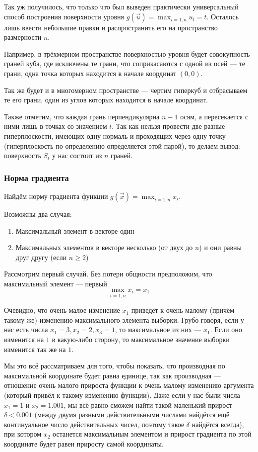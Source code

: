 Так уж получилось, что только что был выведен
практически универсальный способ построения поверхности уровня
$g\left( \vec{u} \right) = \max_{i= \overline{1,n}} u_i = t$.
Осталось лишь ввести небольшие правки и распространить его на
пространство размерности $n$.

Например, в трёхмерном пространстве поверхностью уровня будет
совокупность граней куба, где исключены те грани,
что соприкасаются с одной из осей --- те грани, одна точка которых
находится в начале координат $\left( 0, 0 \right)$.

Так же будет и в многомерном пространстве --- чертим гиперкуб
и отбрасываем те его грани, один из углов которых находится в начале координат.

Также отметим, что каждая грань перпендикулярна $n-1$ осям,
а пересекается с ними лишь в точках со значением $t$.
Так как нельзя провести две разные гиперплоскости, имеющих одну нормаль
и проходящих через одну точку (гиперплоскость по определению
определяется этой парой), то делаем вывод:
поверхность $S_t$ у нас состоит из $n$ граней.

\subsubsection{Норма градиента}
Найдём норму градиента функции
$g\left( \vec{x} \right) = \max_{i= \overline{1,n}} x_i$.

Возможны два случая:
\begin{enumerate}
  \item Максимальный элемент в векторе один
  \item Максимальных элементов в векторе несколько
      (от двух до $n$) и они равны друг другу (если $n \ge 2$)
\end{enumerate}

Рассмотрим первый случай. Без потери общности предположим,
что максимальный элемент --- первый
$$\max_{i= \overline{1,n}} x_i = x_1$$

Очевидно, что очень малое изменение $x_1$ приведёт к
очень малому (причём такому же) изменению максимального элемента выборки.
Грубо говоря, если у нас есть числа $x_1 = 3, x_2 = 2, x_3 = 1$,
то максимальное из них --- $x_1$. Если оно изменится на $1$
в какую-либо сторону, то максимальное значение выборки изменится
так же на $1$.

Мы это всё рассматриваем для того, чтобы показать,
что производная по максимальной координате будет равна единице,
так как производная --- отношение очень малого прироста функции
к очень малому изменению аргумента (который привёл к такому изменению функции).
Даже если у нас были числа $x_1 = 1$ и $x_2 = 1.001$,
мы всё равно сможем найти такой маленький прирост $\delta < 0.001$
(между двумя разными действительными числами найдётся ещё континуальное число
действительных чисел, поэтому такое $\delta$ найдётся всегда),
при котором $x_2$ останется максимальным элементом и прирост градиента
по этой координате будет равен приросту самой координаты.

